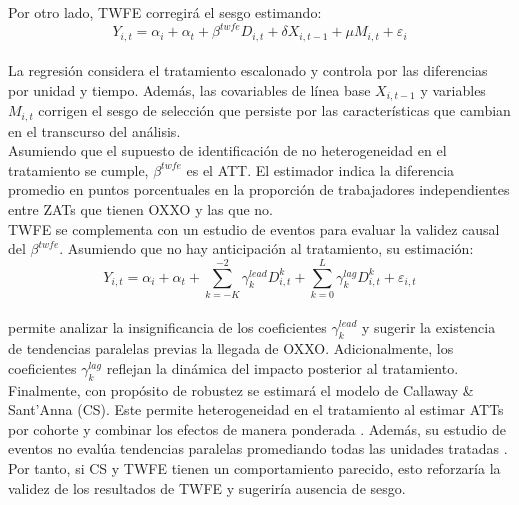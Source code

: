 \documentclass{article}
\begin{document}
Por otro lado, TWFE corregirá el sesgo estimando:\\

\begin{equation}
Y_{i,t} = \alpha_i + \alpha_t  +\beta^{twfe} D_{i,t} + \delta X_{i,t-1} + \mu M_{i,t}+\varepsilon_{i}
\label{eq:twfe}
\end{equation}\\

La regresión considera el tratamiento escalonado y controla por las diferencias por unidad y tiempo. Además, las covariables de línea base $X_{i,t-1}$ y variables $ M_{i,t}$ corrigen el sesgo de selección que persiste por las características que cambian en el transcurso del análisis.\\

Asumiendo que el supuesto de identificación de no heterogeneidad en el tratamiento se cumple, $\beta^{twfe}$ es el ATT. El estimador indica la diferencia promedio en puntos porcentuales en la proporción de trabajadores independientes entre ZATs que tienen OXXO y las que no.\\

TWFE se complementa con un estudio de eventos para evaluar la validez causal del $\beta^{twfe}$. Asumiendo que no hay anticipación al tratamiento, su estimación:\\

\begin{equation}
Y_{i,t} = \alpha_i + \alpha_t 
+ \sum_{k=-K}^{-2} \gamma^{lead}_k D^k_{i,t} 
+ \sum_{k=0}^{L} \gamma^{lag}_k D^k_{i,t} 
+ \varepsilon_{i,t}
\label{eq:eventstudy}
\end{equation}\\

permite analizar la insignificancia de los coeficientes $\gamma^{lead}_k$ y sugerir la existencia de tendencias paralelas previas la llegada de OXXO. Adicionalmente, los coeficientes $\gamma^{lag}_k$ reflejan la dinámica del impacto posterior al tratamiento.\\

Finalmente, con propósito de robustez se estimará el modelo de Callaway \& Sant’Anna (CS). Este permite heterogeneidad en el tratamiento al estimar ATTs por cohorte y combinar los efectos de manera ponderada \parencite{RiosAvila_Callaway_SantAnna_2021_csdid_slides,Callaway_SantAnna_2021}. Además, su estudio de eventos no evalúa tendencias paralelas promediando todas las unidades tratadas  \parencite{RiosAvila_Callaway_SantAnna_2021_csdid_slides,Callaway_SantAnna_2021}. 
Por tanto, si CS y TWFE tienen un comportamiento parecido, esto reforzaría la validez de los resultados de TWFE y sugeriría ausencia de sesgo.
\end{document}
